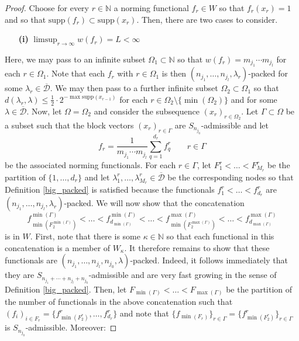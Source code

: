 \documentclass[12pt,a4paper]{amsart}
\newcommand{\N}{\mathbb{N}}
\newcommand{\bes}{\begin{equation*}}
\newcommand{\ees}{\end{equation*}}
\newcommand{\supp}{\text{supp}}
\theoremstyle{definition}
\theoremstyle{plain}
\begin{document}
\begin{proof}
Choose for every $r\in\N$ a norming functional $f_{r}\in W$ so that $f_{r}(x_{r})=1$ and so that $\supp(f_{r})\subset\supp(x_{r})$. Then, there are two cases to consider.
\begin{itemize}
\item[\textbf{(i)}] $\limsup_{r\to\infty}w(f_{r})=L<\infty$
\end{itemize} 
Here, we may pass to an infinite subset $\Omega_{1}\subset\N$ so that $w(f_{r})=m_{j_{1}}\cdots m_{j_{l}}$ for each $r\in\Omega_{1}$. Note that each $f_{r}$ with $r\in\Omega_{1}$ is then $(n_{j_{1}},\ldots,n_{j_{l}},\lambda_{r})$-packed for some $\lambda_{r}\in\overline{\mathcal{D}}$. We may then pass to a further infinite subset $\Omega_{2}\subset\Omega_{1}$ so that $d(\lambda_{r},\lambda)\leq \frac{1}{2}\cdot 2^{-\max\supp(x_{r-1})}$ for each $r\in\Omega_{2}\setminus\{\min(\Omega_{2})\}$ and for some $\lambda\in\overline{\mathcal{D}}$. Now, let $\Omega=\Omega_{2}$ and consider the subsequence $(x_{r})_{r\in\Omega_{2}}$. Let $\Gamma\subset\Omega$ be a subset such that the block vectors $(x_{r})_{r\in \Gamma}$ are $S_{n_{j_{0}}}$-admissible and let 
\bes f_{r}=\frac{1}{m_{j_{1}}\cdots m_{j_{l}}}\sum_{q=1}^{d_{r}}f^{r}_{q} \qquad r\in\Gamma \ees
be the associated norming functionals. For each $r\in\Gamma$, let $F^{r}_{1}<\ldots<F^{r}_{M_{r}}$ be the partition of $\{1,\ldots,d_{r}\}$ and let $\lambda^{r}_{1},\ldots,\lambda^{r}_{M_{r}}\in\overline{\mathcal{D}}$ be the corresponding nodes so that Definition \ref{big_packed} is satisfied because the functionals $f^{r}_{1}<\ldots<f^{r}_{d_{r}}$ are $(n_{j_{1}},\ldots,n_{j_{l}},\lambda_{r})$-packed. We will now show that the concatenation
\bes f^{\min(\Gamma)}_{\min(F^{\min(\Gamma)}_{2})}<\ldots<f^{\min(\Gamma)}_{d_{\min(\Gamma)}}<\ldots<f^{\max(\Gamma)}_{\min(F_{2}^{\max(\Gamma)})}<\ldots<f^{\max(\Gamma)}_{d_{\max(\Gamma)}} \ees
is in $W$. First, note that there is some $\kappa\in\N$ so that each functional in this concatenation is a member of $W_{\kappa}$. It therefore remains to show that these functionals are $(n_{j_{1}},\ldots,n_{j_{l}},n_{j_{0}},\lambda)$-packed. Indeed, it follows immediately that they are $S_{n_{j_{1}}+\cdots+n_{j_{l}}+n_{j_{0}}}$-admissible and are very fast growing in the sense of Definition \ref{big_packed}. Then, let $F_{\min(\Gamma)}<\ldots<F_{\max(\Gamma)}$ be the partition of the number of functionals in the above concatenation such that $(f_{i})_{i\in F_{r}}=\{f^{r}_{\min(F^{r}_{2})},\ldots,f^{r}_{d_{r}}\}$ and note that $\{f_{\min(F_{r})}\}_{r\in\Gamma}=\{f^{r}_{\min(F^{r}_{2})}\}_{r\in\Gamma}$ is $S_{n_{j_{0}}}$-admissible. Moreover:

\end{proof}
\end{document}
